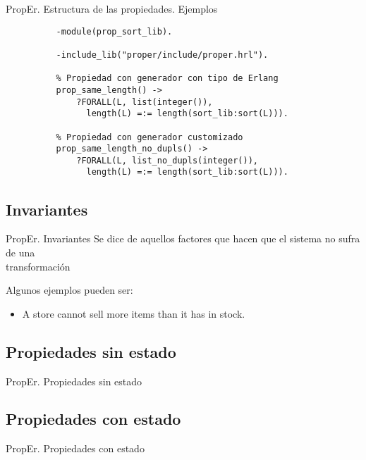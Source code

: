 \documentclass{beamer}
\begin{document}
      \begin{frame}[fragile]{PropEr. Estructura de las propiedades. Ejemplos}
        \begin{verbatim}
          -module(prop_sort_lib).

          -include_lib("proper/include/proper.hrl").

          % Propiedad con generador con tipo de Erlang
          prop_same_length() ->
              ?FORALL(L, list(integer()),
                length(L) =:= length(sort_lib:sort(L))).

          % Propiedad con generador customizado
          prop_same_length_no_dupls() ->
              ?FORALL(L, list_no_dupls(integer()),
                length(L) =:= length(sort_lib:sort(L))).
        \end{verbatim}
      \end{frame}

    \subsection{Invariantes}
      \begin{frame}{PropEr. Invariantes}
        Se dice de aquellos factores que hacen que el sistema no sufra de una\\
        transformación

        Algunos ejemplos pueden ser:
        \begin{itemize}
          \item A store cannot sell more items than it has in stock.
        \end{itemize}
      \end{frame}
    \subsection{Propiedades sin estado}
      \begin{frame}{PropEr. Propiedades sin estado}
      \end{frame}
    \subsection{Propiedades con estado}
      \begin{frame}{PropEr. Propiedades con estado}
      \end{frame}
\end{document}
